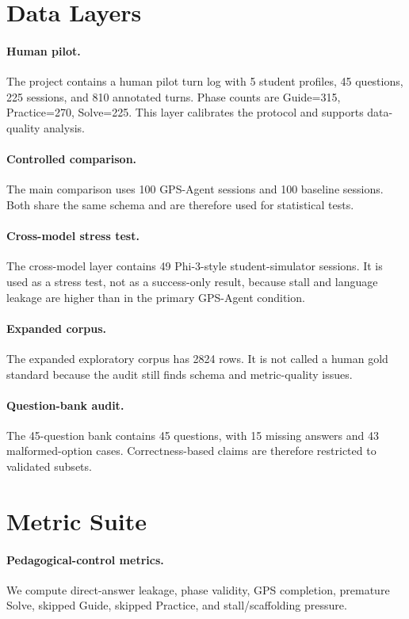 \documentclass[11pt]{article}
\begin{document}
\section{Data Layers}
\paragraph{Human pilot.} The project contains a human pilot turn log with 5 student profiles, 45 questions, 225 sessions, and 810 annotated turns. Phase counts are Guide=315, Practice=270, Solve=225. This layer calibrates the protocol and supports data-quality analysis.

\paragraph{Controlled comparison.} The main comparison uses 100 GPS-Agent sessions and 100 baseline sessions. Both share the same schema and are therefore used for statistical tests.

\paragraph{Cross-model stress test.} The cross-model layer contains 49 Phi-3-style student-simulator sessions. It is used as a stress test, not as a success-only result, because stall and language leakage are higher than in the primary GPS-Agent condition.

\paragraph{Expanded corpus.} The expanded exploratory corpus has 2824 rows. It is not called a human gold standard because the audit still finds schema and metric-quality issues.

\paragraph{Question-bank audit.} The 45-question bank contains 45 questions, with 15 missing answers and 43 malformed-option cases. Correctness-based claims are therefore restricted to validated subsets.

\section{Metric Suite}
\paragraph{Pedagogical-control metrics.} We compute direct-answer leakage, phase validity, GPS completion, premature Solve, skipped Guide, skipped Practice, and stall/scaffolding pressure.
\end{document}
